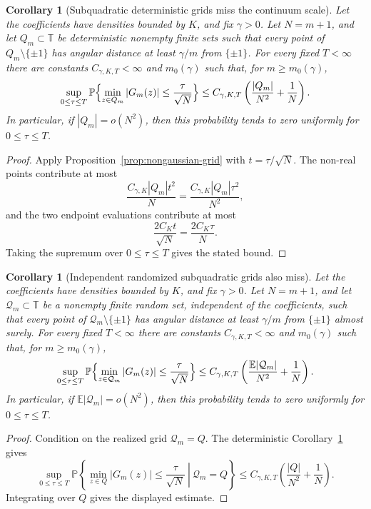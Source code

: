 \documentclass[11pt]{amsart}
\numberwithin{equation}{section}
\newtheorem{corollary}[theorem]{Corollary}
\theoremstyle{definition}
\theoremstyle{remark}
\newcommand{\T}{\mathbb T}
\newcommand{\Prob}{\mathbb P}
\newcommand{\Exp}{\mathbb E}
\newcommand{\abs}[1]{\left\lvert #1\right\rvert}
\begin{document}
\begin{corollary}[Subquadratic deterministic grids miss the continuum scale]
\label{cor:subquadratic-grid-misses}
Let the coefficients have densities bounded by \(K\), and fix
\(\gamma>0\).  Let \(N=m+1\), and let \(Q_m\subset\T\) be deterministic nonempty finite
sets such that every point of \(Q_m\setminus\{\pm1\}\) has angular distance at
least \(\gamma/m\) from \(\{\pm1\}\).  For every fixed \(T<\infty\) there are
constants \(C_{\gamma,K,T}<\infty\) and \(m_0(\gamma)\) such that, for
\(m\ge m_0(\gamma)\),
\[
  \sup_{0\le \tau\le T}
  \Prob\Bigl\{\min_{z\in Q_m}\abs{G_m(z)}
      \le \frac{\tau}{\sqrt N}\Bigr\}
  \le C_{\gamma,K,T}\left(\frac{|Q_m|}{N^2}+\frac1N\right).
\]
In particular, if \(|Q_m|=o(N^2)\), then this probability tends to zero
uniformly for \(0\le\tau\le T\).
\end{corollary}

\begin{proof}
Apply Proposition~\ref{prop:nongaussian-grid} with
\(t=\tau/\sqrt N\).  The non-real points contribute at most
\[
  \frac{C_{\gamma,K}|Q_m|t^2}{N}
  =\frac{C_{\gamma,K}|Q_m|\tau^2}{N^2},
\]
and the two endpoint evaluations contribute at most
\[
  \frac{2C_Kt}{\sqrt N}=\frac{2C_K\tau}{N}.
\]
Taking the supremum over \(0\le\tau\le T\) gives the stated bound.
\end{proof}

\begin{corollary}[Independent randomized subquadratic grids also miss]
\label{cor:random-subquadratic-grid-misses}
Let the coefficients have densities bounded by \(K\), and fix
\(\gamma>0\).  Let \(N=m+1\), and let \(\mathcal Q_m\subset\T\) be a nonempty
finite random set, independent of the coefficients, such that every point of
\(\mathcal Q_m\setminus\{\pm1\}\) has angular distance at least
\(\gamma/m\) from \(\{\pm1\}\) almost surely.  For every fixed \(T<\infty\)
there are constants \(C_{\gamma,K,T}<\infty\) and \(m_0(\gamma)\) such that,
for \(m\ge m_0(\gamma)\),
\[
  \sup_{0\le \tau\le T}
  \Prob\Bigl\{\min_{z\in \mathcal Q_m}\abs{G_m(z)}
      \le \frac{\tau}{\sqrt N}\Bigr\}
  \le C_{\gamma,K,T}\left(\frac{\Exp|\mathcal Q_m|}{N^2}+\frac1N\right).
\]
In particular, if \(\Exp|\mathcal Q_m|=o(N^2)\), then this probability tends
to zero uniformly for \(0\le\tau\le T\).
\end{corollary}

\begin{proof}
Condition on the realized grid \(\mathcal Q_m=Q\).  The deterministic
Corollary~\ref{cor:subquadratic-grid-misses} gives
\[
  \sup_{0\le\tau\le T}
  \Prob\left\{\left.
  \min_{z\in Q}\abs{G_m(z)}\le \frac{\tau}{\sqrt N}
  \ \right|\ \mathcal Q_m=Q\right\}
  \le C_{\gamma,K,T}\left(\frac{|Q|}{N^2}+\frac1N\right).
\]
Integrating over \(Q\) gives the displayed estimate.
\end{proof}
\end{document}
